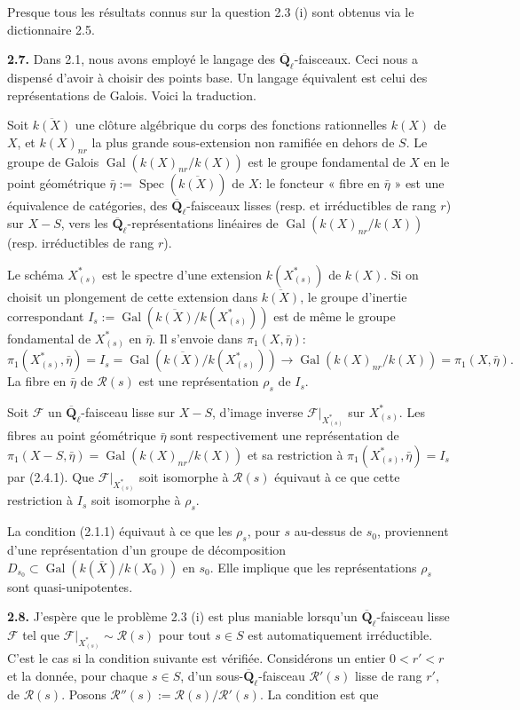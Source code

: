 \documentclass[11pt]{article}
\newcommand{\Qbl}{\overline{\mathbf{Q}}_{\ell}}
\newcommand{\Spec}{\operatorname{Spec}}
\newcommand{\Gal}{\operatorname{Gal}}
\newcommand{\Rcal}{\mathcal{R}}
\newcommand{\Fcal}{\mathcal{F}}
\newcommand{\para}[1]{\medskip\noindent\textbf{#1}\enspace}
\begin{document}
Presque tous les résultats connus sur la question 2.3 (i) sont obtenus via le dictionnaire 2.5.

\para{2.7.} Dans 2.1, nous avons employé le langage des \(\Qbl\)-faisceaux. Ceci nous a dispensé d'avoir à choisir des points base. Un langage équivalent est celui des représentations de Galois. Voici la traduction.

Soit \(\overline{k(X)}\) une clôture algébrique du corps des fonctions rationnelles \(k(X)\) de \(X\), et \(k(X)_{nr}\) la plus grande sous-extension non ramifiée en dehors de \(S\). Le groupe de Galois \(\Gal(k(X)_{nr}/k(X))\) est le groupe fondamental de \(X\) en le point géométrique \(\bar\eta:=\Spec(\overline{k(X)})\) de \(X\): le foncteur « fibre en \(\bar\eta\) » est une équivalence de catégories, des \(\Qbl\)-faisceaux lisses (resp. et irréductibles de rang \(r\)) sur \(X-S\), vers les \(\Qbl\)-représentations linéaires de \(\Gal(k(X)_{nr}/k(X))\) (resp. irréductibles de rang \(r\)).

Le schéma \(X^*_{(s)}\) est le spectre d'une extension \(k(X^*_{(s)})\) de \(k(X)\). Si on choisit un plongement de cette extension dans \(\overline{k(X)}\), le groupe d'inertie correspondant \(I_s:=\Gal(\overline{k(X)}/k(X^*_{(s)}))\) est de même le groupe fondamental de \(X^*_{(s)}\) en \(\bar\eta\). Il s'envoie dans \(\pi_1(X,\bar\eta)\):
\begin{equation}
\pi_1(X^*_{(s)},\bar\eta)=I_s=\Gal(\overline{k(X)}/k(X^*_{(s)}))\longrightarrow \Gal(k(X)_{nr}/k(X))=\pi_1(X,\bar\eta).
\tag{2.7.1}
\end{equation}
La fibre en \(\bar\eta\) de \(\Rcal(s)\) est une représentation \(\rho_s\) de \(I_s\).

Soit \(\Fcal\) un \(\Qbl\)-faisceau lisse sur \(X-S\), d'image inverse \(\Fcal|_{X^*_{(s)}}\) sur \(X^*_{(s)}\). Les fibres au point géométrique \(\bar\eta\) sont respectivement une représentation de \(\pi_1(X-S,\bar\eta)=\Gal(k(X)_{nr}/k(X))\) et sa restriction à \(\pi_1(X^*_{(s)},\bar\eta)=I_s\) par (2.4.1). Que \(\Fcal|_{X^*_{(s)}}\) soit isomorphe à \(\Rcal(s)\) équivaut à ce que cette restriction à \(I_s\) soit isomorphe à \(\rho_s\).

La condition (2.1.1) équivaut à ce que les \(\rho_s\), pour \(s\) au-dessus de \(s_0\), proviennent d'une représentation d'un groupe de décomposition \(D_{s_0}\subset \Gal(k(\overline X)/k(X_0))\) en \(s_0\). Elle implique que les représentations \(\rho_s\) sont quasi-unipotentes.

\para{2.8.} J'espère que le problème 2.3 (i) est plus maniable lorsqu'un \(\Qbl\)-faisceau lisse \(\Fcal\) tel que \(\Fcal|_{X^*_{(s)}}\sim\Rcal(s)\) pour tout \(s\in S\) est automatiquement irréductible. C'est le cas si la condition suivante est vérifiée. Considérons un entier \(0<r'<r\) et la donnée, pour chaque \(s\in S\), d'un sous-\(\Qbl\)-faisceau \(\Rcal'(s)\) lisse de rang \(r'\), de \(\Rcal(s)\). Posons \(\Rcal''(s):=\Rcal(s)/\Rcal'(s)\). La condition est que
\end{document}

